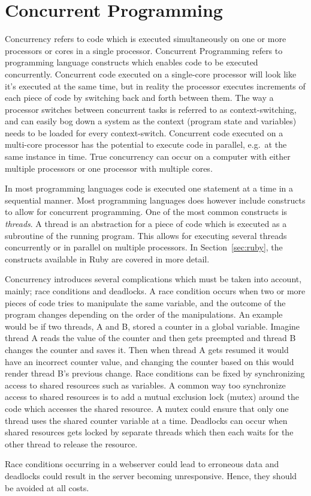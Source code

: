 \section{Concurrent Programming} %
\label{sec:concurrent}
Concurrency refers to code which is executed simultaneously on one or more
processors or cores in a single processor. Concurrent Programming refers to
programming language constructs which enables code to be executed concurrently.
Concurrent code executed on a single-core processor will look like it's executed
at the same time, but in reality the processor executes increments of each piece
of code by switching back and forth between them. The way a processor switches
between concurrent tasks is referred to as context-switching, and can easily bog
down a system as the context (program state and variables) needs to be loaded
for every context-switch.  Concurrent code executed on a multi-core processor
has the potential to execute code in parallel, e.g.\ at the same instance in
time. True concurrency can occur on a computer with either multiple processors
or one processor with multiple cores.

In most programming languages code is executed one statement at a time in a
sequential manner. Most programming languages does however include constructs
to allow for concurrent programming.  One of the most common constructs is
\textit{threads}. A thread is an abstraction for a piece of code which is
executed as a subroutine of the running program. This allows for executing
several threads concurrently or in parallel on multiple processors.  In
Section~\ref{sec:ruby}, the constructs available in Ruby are covered in more
detail.

Concurrency introduces several complications which must be taken into account,
mainly; race conditions and deadlocks. A race condition occurs when two or more
pieces of code tries to manipulate the same variable, and the outcome of the
program changes depending on the order of the manipulations. An example would be
if two threads, A and B, stored a counter in a global variable. Imagine thread A 
reads the value of the counter and then gets preempted and thread B changes
the counter and saves it. Then when thread A gets resumed it would have an
incorrect counter value, and changing the counter based on this would render
thread B's previous change. Race conditions can be fixed by synchronizing access
to shared resources such as variables. A common way too synchronize access to
shared resources is to add a mutual exclusion lock (mutex) around the code which
accesses the shared resource. A mutex could ensure that only one thread uses the
shared counter variable at a time. Deadlocks can occur when shared resources gets
locked by separate threads which then each waits for the other thread to
release the resource.

Race conditions occurring in a webserver could lead to erroneous data and
deadlocks could result in the server becoming unresponsive. Hence, they should
be avoided at all costs.
